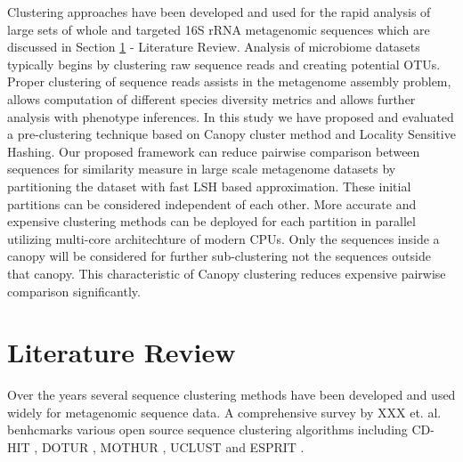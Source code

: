\documentclass[10pt, conference, compsocconf]{IEEEtran}
\begin{document}
Clustering approaches have been developed and used for the rapid analysis of large sets of whole and targeted 16S rRNA metagenomic sequences which are discussed in Section \ref{sec:1} - Literature Review. Analysis of microbiome datasets typically begins by clustering raw sequence reads and creating potential OTUs. Proper clustering of sequence reads assists in the metagenome assembly problem, allows computation of different species diversity metrics and allows further analysis with phenotype inferences. In this study we have proposed and evaluated a pre-clustering technique based on Canopy cluster method and Locality Sensitive Hashing. Our proposed framework can reduce pairwise comparison between sequences for similarity measure in large scale metagenome datasets by partitioning the dataset with fast LSH based approximation. These initial partitions can be considered independent of each other. More accurate and expensive clustering methods can be deployed for each partition in parallel utilizing multi-core architechture of modern CPUs. Only the sequences inside a canopy will be considered for further sub-clustering not the sequences outside that canopy. This characteristic of Canopy clustering reduces expensive pairwise comparison significantly.       



\section{Literature Review}
\label{sec:1}


Over the years several sequence clustering methods have been developed 
and used widely for metagenomic sequence data. A comprehensive 
survey by XXX et. al. \cite{xxx} benhcmarks various  open source sequence 
clustering algorithms  including 
CD-HIT \cite{MARCDhit}, DOTUR \cite{MARDOTUR}, MOTHUR \cite{MARMothur}, UCLUST \cite{xx} 
and ESPRIT \cite{MAREspirit}. 
\end{document}
